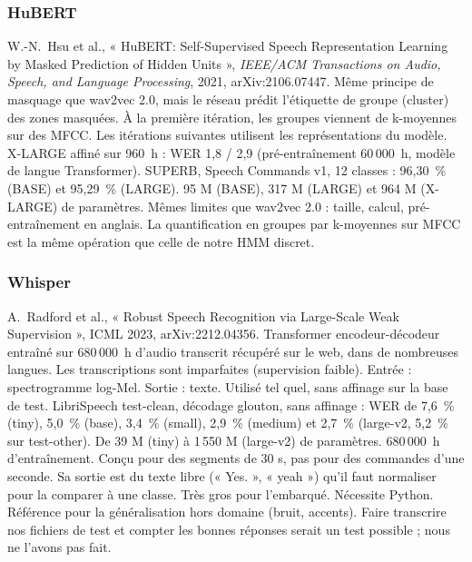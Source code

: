 \subsubsection*{HuBERT}
\fichemodele
{W.-N.~Hsu et al., « HuBERT: Self-Supervised Speech Representation Learning by Masked Prediction of Hidden Units », \emph{IEEE/ACM Transactions on Audio, Speech, and Language Processing}, 2021, arXiv:2106.07447.}
{Même principe de masquage que wav2vec 2.0, mais le réseau prédit l'étiquette de groupe (cluster) des zones masquées. À la première itération, les groupes viennent de k-moyennes sur des MFCC. Les itérations suivantes utilisent les représentations du modèle.}
{X-LARGE affiné sur 960~h : WER 1,8 / 2,9 (pré-entraînement 60\,000~h, modèle de langue Transformer). SUPERB, Speech Commands v1, 12 classes : 96,30~\% (BASE) et 95,29~\% (LARGE).}
{95 M (BASE), 317 M (LARGE) et 964 M (X-LARGE) de paramètres.}
{Mêmes limites que wav2vec 2.0 : taille, calcul, pré-entraînement en anglais.}
{La quantification en groupes par k-moyennes sur MFCC est la même opération que celle de notre HMM discret.}

\subsubsection*{Whisper}
\fichemodele
{A.~Radford et al., « Robust Speech Recognition via Large-Scale Weak Supervision », ICML 2023, arXiv:2212.04356.}
{Transformer encodeur-décodeur entraîné sur 680\,000~h d'audio transcrit récupéré sur le web, dans de nombreuses langues. Les transcriptions sont imparfaites (supervision faible). Entrée : spectrogramme log-Mel. Sortie : texte. Utilisé tel quel, sans affinage sur la base de test.}
{LibriSpeech test-clean, décodage glouton, sans affinage : WER de 7,6~\% (tiny), 5,0~\% (base), 3,4~\% (small), 2,9~\% (medium) et 2,7~\% (large-v2, 5,2~\% sur test-other).}
{De 39 M (tiny) à 1\,550 M (large-v2) de paramètres. 680\,000~h d'entraînement.}
{Conçu pour des segments de 30 s, pas pour des commandes d'une seconde. Sa sortie est du texte libre (« Yes. », « yeah ») qu'il faut normaliser pour la comparer à une classe. Très gros pour l'embarqué. Nécessite Python.}
{Référence pour la généralisation hors domaine (bruit, accents). Faire transcrire nos fichiers de test et compter les bonnes réponses serait un test possible ; nous ne l'avons pas fait.}

